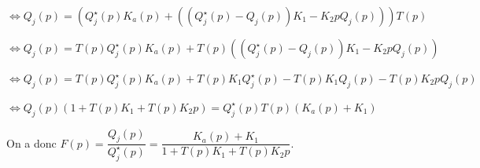 \documentclass[10pt,fleqn]{article} %
\begin{document}

$\Leftrightarrow Q_j(p) = 
\left(
    Q_j^{\star}(p) K_a(p) + 
    \left( 
        \left(Q_j^{\star}(p) - Q_j(p) \right) K_1 - K_2 p Q_j(p) 
    \right)
\right) T(p)$

$\Leftrightarrow Q_j(p) = 
    T(p)Q_j^{\star}(p) K_a(p) + 
    T(p)\left( 
        \left(Q_j^{\star}(p) - Q_j(p) \right) K_1 - K_2 p Q_j(p) 
    \right) $

$\Leftrightarrow Q_j(p) = 
    T(p)Q_j^{\star}(p) K_a(p) + 
        T(p)K_1 Q_j^{\star}(p) -T(p)K_1  Q_j(p)   - T(p)K_2 p Q_j(p) 
     $

$\Leftrightarrow Q_j(p)\left(1     +T(p)K_1     + T(p)K_2 p\right)= 
      Q_j^{\star}(p)T(p) \left(  K_a(p)     +K_1 \right)     $

On a donc $F(p)=\dfrac{Q_j(p)}{Q_j^{\star}(p)}=\dfrac{ K_a(p) +K_1}{1+T(p)K_1 + T(p)K_2 p}$.


\subparagraph{}\textit{}%

\subparagraph{}\textit{}%
\end{document}
